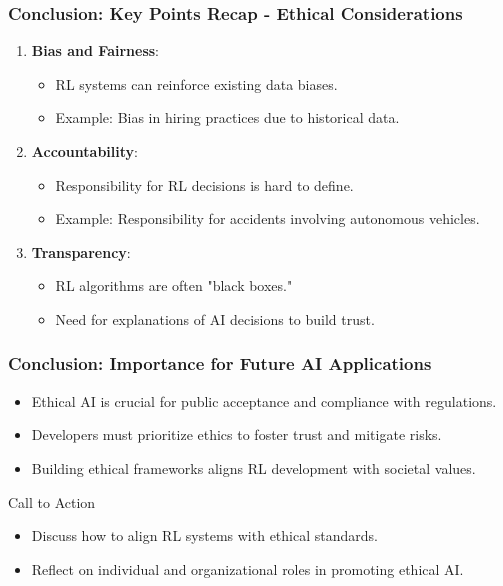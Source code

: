\documentclass[aspectratio=169]{beamer}
\begin{document}
\begin{frame}[fragile]
    \frametitle{Conclusion: Key Points Recap - Ethical Considerations}
    \begin{enumerate}
        \item \textbf{Bias and Fairness}:
            \begin{itemize}
                \item RL systems can reinforce existing data biases.
                \item Example: Bias in hiring practices due to historical data.
            \end{itemize}
        \item \textbf{Accountability}:
            \begin{itemize}
                \item Responsibility for RL decisions is hard to define.
                \item Example: Responsibility for accidents involving autonomous vehicles.
            \end{itemize}
        \item \textbf{Transparency}:
            \begin{itemize}
                \item RL algorithms are often "black boxes."
                \item Need for explanations of AI decisions to build trust.
            \end{itemize}
    \end{enumerate}
\end{frame}

\begin{frame}[fragile]
    \frametitle{Conclusion: Importance for Future AI Applications}
    \begin{itemize}
        \item Ethical AI is crucial for public acceptance and compliance with regulations.
        \item Developers must prioritize ethics to foster trust and mitigate risks.
        \item Building ethical frameworks aligns RL development with societal values.
    \end{itemize}
    
    \begin{block}{Call to Action}
        \begin{itemize}
            \item Discuss how to align RL systems with ethical standards.
            \item Reflect on individual and organizational roles in promoting ethical AI.
        \end{itemize}
    \end{block}
\end{frame}
\end{document}
